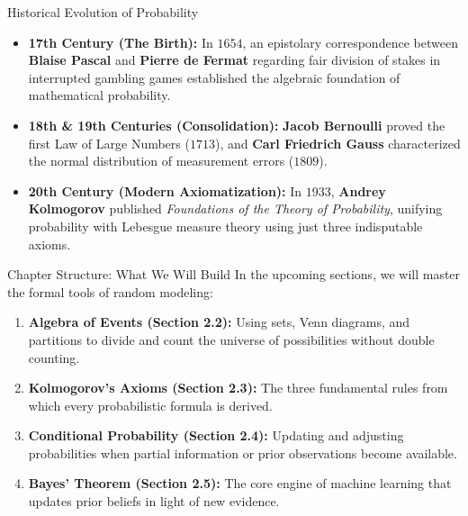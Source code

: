 \documentclass[10pt,aspectratio=169]{beamer}
\begin{document}
\begin{frame}{Historical Evolution of Probability}
  \begin{itemize}
    \item \textbf{17th Century (The Birth):} In $1654$, an epistolary correspondence between \textbf{Blaise Pascal} and \textbf{Pierre de Fermat} regarding fair division of stakes in interrupted gambling games established the algebraic foundation of mathematical probability. \pause
    \item \textbf{18th \& 19th Centuries (Consolidation):} \textbf{Jacob Bernoulli} proved the first Law of Large Numbers ($1713$), and \textbf{Carl Friedrich Gauss} characterized the normal distribution of measurement errors ($1809$). \pause
    \item \textbf{20th Century (Modern Axiomatization):} In $1933$, \textbf{Andrey Kolmogorov} published \emph{Foundations of the Theory of Probability}, unifying probability with Lebesgue measure theory using just three indisputable axioms.
  \end{itemize}
\end{frame}

\begin{frame}{Chapter Structure: What We Will Build}
  In the upcoming sections, we will master the formal tools of random modeling:
  \vspace{0.6em}
  \begin{enumerate}
    \item \textbf{Algebra of Events (Section 2.2):} Using sets, Venn diagrams, and partitions to divide and count the universe of possibilities without double counting. \pause
    \item \textbf{Kolmogorov's Axioms (Section 2.3):} The three fundamental rules from which every probabilistic formula is derived. \pause
    \item \textbf{Conditional Probability (Section 2.4):} Updating and adjusting probabilities when partial information or prior observations become available. \pause
    \item \textbf{Bayes' Theorem (Section 2.5):} The core engine of machine learning that updates prior beliefs in light of new evidence.
  \end{enumerate}
\end{frame}
\end{document}
